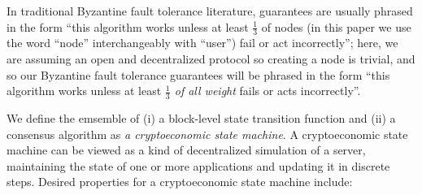 \documentclass[11pt,a4paper]{article}
\theoremstyle{plain}
\theoremstyle{definition}
\theoremstyle{remark}
\begin{document}
In traditional Byzantine fault tolerance literature, guarantees are usually phrased in the form ``this algorithm works unless at least $\frac{1}{3}$ of nodes (in this paper we use the word ``node'' interchangeably with ``user'') fail or act incorrectly''; here, we are assuming an open and decentralized protocol so creating a node is trivial, and so our Byzantine fault tolerance guarantees will be phrased in the form ``this algorithm works unless at least \emph{$\frac{1}{3}$ of all weight} fails or acts incorrectly''.

We define the emsemble of (i) a block-level state transition function and (ii) a consensus algorithm as \emph{a cryptoeconomic state machine}. A cryptoeconomic state machine can be viewed as a kind of decentralized simulation of a server, maintaining the state of one or more applications and updating it in discrete steps. Desired properties for a cryptoeconomic state machine include:
\end{document}
